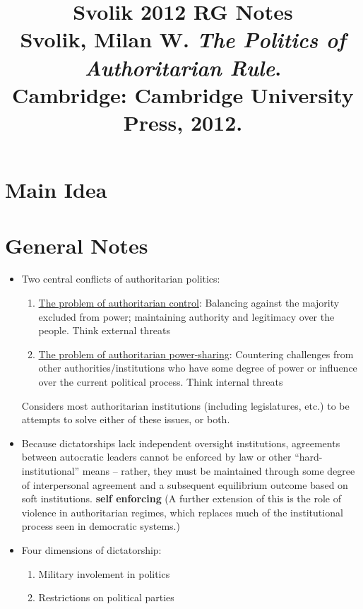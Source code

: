 \documentclass[12pt]{article}
\title{\textbf{Svolik 2012 RG Notes}\\
\large Svolik, Milan W. \textit{The Politics of Authoritarian Rule}.\\
Cambridge: Cambridge University Press, 2012.}
\author{}
\date{}
\begin{document}
\maketitle

\section{Main Idea}



\section{General Notes}

\begin{itemize}[leftmargin=*, itemsep=4pt]
    \item Two central conflicts of authoritarian politics:
    \begin{enumerate}
        \item \underline{The problem of authoritarian control}: Balancing against the majority excluded from power; maintaining authority and legitimacy over the people. Think external threats
        \item \underline{The problem of authoritarian power-sharing}: Countering challenges from other authorities/institutions who have some degree of power or influence over the current political process. Think internal threats
    \end{enumerate}
    Considers most authoritarian institutions (including legislatures, etc.) to be attempts to solve either of these issues, or both.
    \item Because dictatorships lack independent oversight institutions, agreements between autocratic leaders cannot be enforced by law or other ``hard-institutional'' means -- rather, they must be maintained through some degree of interpersonal agreement and a subsequent equilibrium outcome based on soft institutions. \textbf{self enforcing} (A further extension of this is the role of violence in authoritarian regimes, which replaces much of the institutional process seen in democratic systems.)
    \item Four dimensions of dictatorship:
    \begin{enumerate}
        \item Military involement in politics
        \item Restrictions on political parties

\end{enumerate}
\end{itemize}
\end{document}
